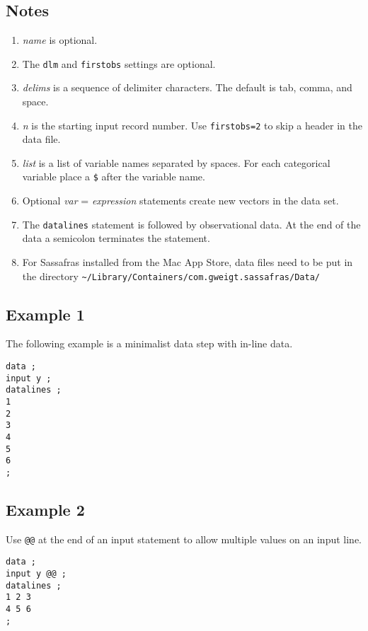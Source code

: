 \documentclass[12pt]{article}
\begin{document}
\subsection*{Notes}

\begin{enumerate}
\item
{\it name} is optional.
\item
The {\tt dlm} and {\tt firstobs} settings are optional.
\item
{\it delims} is a sequence of delimiter characters.
The default is tab, comma, and space.
\item
{\it n} is the starting input record number.
Use {\tt firstobs=2} to skip a header in the data file.
\item
{\it list} is a list of variable names separated by spaces.
For each categorical variable place a {\tt\$} after the variable name.
\item
Optional {\it var} = {\it expression} statements
create new vectors in the data set.
\item
The {\tt datalines} statement is followed by observational data.
At the end of the data a semicolon terminates the statement.
\item
For Sassafras installed from the Mac App Store,
data files need to be put in the directory
{\scriptsize\verb$~/Library/Containers/com.gweigt.sassafras/Data/$}
\end{enumerate}

\subsection*{Example 1}

The following example is a minimalist data step with in-line data.

{\scriptsize\begin{verbatim}
data ;
input y ;
datalines ;
1
2
3
4
5
6
;
\end{verbatim}}

\subsection*{Example 2}

Use \verb$@@$ at the end of an input statement to allow multiple
values on an input line.

{\scriptsize\begin{verbatim}
data ;
input y @@ ;
datalines ;
1 2 3
4 5 6
;
\end{verbatim}}
\end{document}
